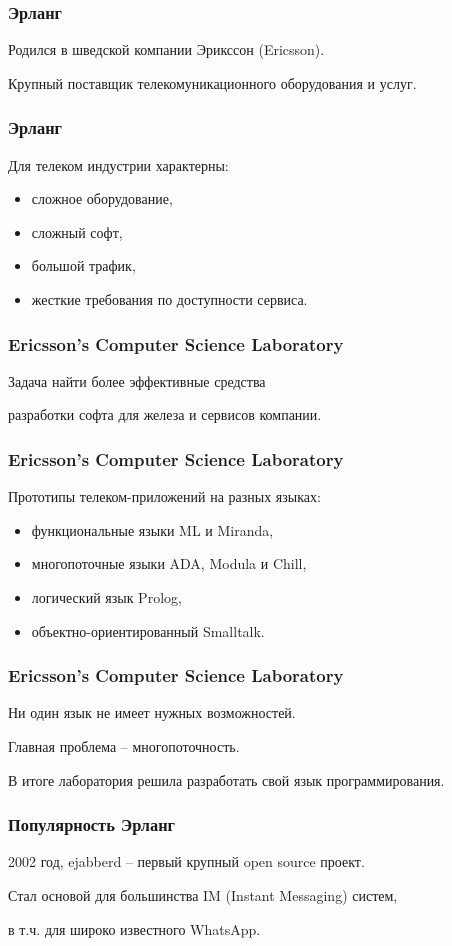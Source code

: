 \documentclass[10pt]{beamer}
\begin{document}
\begin{frame}
  \frametitle{Эрланг}
  Родился в шведской компании Эрикссон (Ericsson).
  \par \bigskip
  Крупный поставщик телекомуникационного
  оборудования и услуг.
\end{frame}

\begin{frame}
  \frametitle{Эрланг}
  Для телеком индустрии характерны:
  \begin{itemize}
  \item сложное оборудование,
  \item сложный софт,
  \item большой трафик,
  \item жесткие требования по доступности сервиса.
  \end{itemize}
\end{frame}

\begin{frame}
  \frametitle{Ericsson’s Computer Science Laboratory}
  Задача найти более эффективные средства
  \par \bigskip
  разработки софта для железа и сервисов компании.
\end{frame}

\begin{frame}
  \frametitle{Ericsson’s Computer Science Laboratory}
  Прототипы телеком-приложений на разных языках:
  \begin{itemize}
  \item функциональные языки ML и Miranda,
  \item многопоточные языки ADA, Modula и Chill,
  \item логический язык Prolog,
  \item объектно-ориентированный Smalltalk.
  \end{itemize}
\end{frame}

\begin{frame}
  \frametitle{Ericsson’s Computer Science Laboratory}
  Ни один язык не имеет нужных возможностей.
  \par \bigskip
  Главная проблема -- многопоточность.
  \par \bigskip
  В итоге лаборатория решила
  разработать свой язык программирования.
\end{frame}

\begin{frame}
  \frametitle{Популярность Эрланг}
  2002 год, ejabberd -- первый крупный open source проект.
  \par \bigskip
  Стал основой для большинства IM (Instant Messaging) систем,
  \par \bigskip
  в т.ч. для широко известного WhatsApp.
\end{frame}
\end{document}
